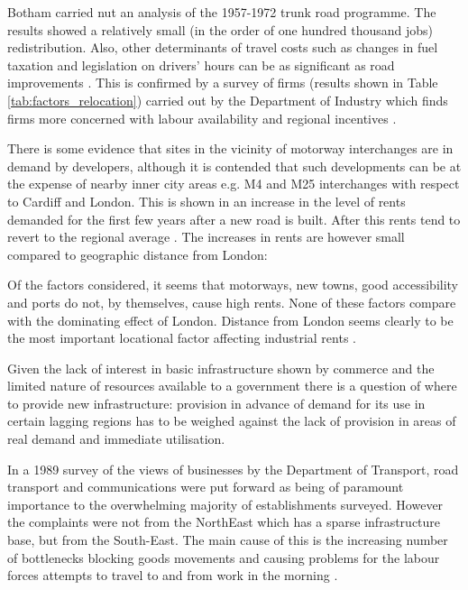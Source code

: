 Botham carried nut an analysis of the 1957-1972 trunk road programme. The results showed a relatively small (in the order of one hundred thousand jobs) redistribution. Also, other determinants of travel costs such as changes in fuel taxation and legislation on drivers' hours can be as significant as road improvements \citep{Botham:1980}. This is confirmed by a survey of firms (results shown in Table \ref{tab:factors_relocation}) carried out by the Department of Industry which finds firms more concerned with labour availability and regional incentives \citep{Maarquand:1980}.



There is some evidence that sites in the vicinity of motorway interchanges are in demand by developers, although it is contended that such developments can be at the expense of nearby inner city areas e.g. M4 and M25 interchanges with respect to Cardiff and London. This is shown in an increase in the level of rents demanded for the first few years after a new road is built. After this rents tend to revert to the regional average \citep{Hillier:1979}. The increases in rents are however small compared to geographic distance from London:

\begin{displayquote}
Of the factors considered, it seems that motorways, new towns, good accessibility and ports do not, by themselves, cause high rents. None of these factors compare with the dominating effect of London. Distance from London seems clearly to be the most important locational factor affecting industrial rents \citep{Hillier:1980}.
\end{displayquote}

Given the lack of interest in basic infrastructure shown by commerce and the limited nature of resources available to a government there is a question of where to provide new infrastructure: provision in advance of demand for its use in certain lagging regions has to be weighed against the lack of provision in areas of real demand and immediate utilisation.

In a 1989 survey of the views of businesses by the Department of Transport, road transport and communications were put forward as being of paramount importance to the overwhelming majority of establishments surveyed. However the complaints were not from the NorthEast which has a sparse infrastructure base, but from the South-East. The main cause of this is the increasing number of bottlenecks blocking goods movements and causing problems for the labour forces attempts to travel to and from work in the morning \citep{DTI:1989}.

